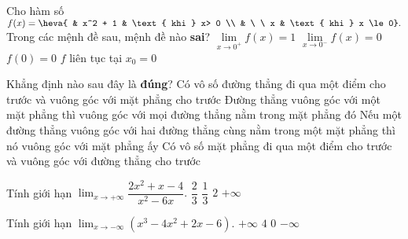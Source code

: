 \begin{ex}%
    Cho hàm số $f(x) = \heva{ & x^2 + 1 & \text{ khi } x> 0 \\ & \ \ x & \text{ khi } x \le 0}.$ Trong các mệnh đề sau, mệnh đề nào {\bf sai}?
    \choice
    {$\lim\limits_{x \to 0^+} f(x) = 1$}
    {$\lim\limits_{x \to 0^-} f(x) = 0$}
    {$f(0) = 0$}
    {\True $f$ liên tục tại $x_0 = 0$}
\end{ex}

\begin{ex}%
    Khẳng định nào sau đây là {\bf đúng}?
    \choice
    {Có vô số đường thẳng đi qua một điểm cho trước và vuông góc với mặt phẳng cho trước}
    {\True Đường thẳng vuông góc với một mặt phẳng thì vuông góc với mọi đường thẳng nằm trong mặt phẳng đó}
    {Nếu một đường thẳng vuông góc với hai đường thẳng cùng nằm trong một mặt phẳng thì nó vuông góc với mặt phẳng ấy}
    {Có vô số mặt phẳng đi qua một điểm cho trước và vuông góc với đường thẳng cho trước}
\end{ex}

\begin{ex}%
	Tính giới hạn $\displaystyle \lim_{x \to +\infty} \dfrac{2x^2+x-4}{x^2-6x}.$
	\choice
	{$\dfrac{2}{3}$}
	{$\dfrac{1}{3}$}
	{\True $2$}
	{$+\infty$}
\end{ex}

\begin{ex}%
	Tính giới hạn $\displaystyle \lim_{x \to -\infty} \left (x^3-4x^2+2x-6\right ).$
	\choice
	{$+\infty$}
	{$4$}
	{$0$}
	{\True $-\infty$}
\end{ex}

